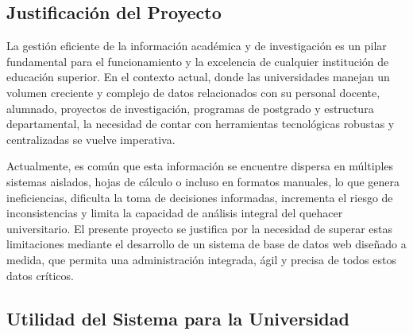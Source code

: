 \subsection{Justificación del Proyecto}
La gestión eficiente de la información académica y de investigación es un pilar fundamental para el funcionamiento y la excelencia de cualquier institución de educación superior. En el contexto actual, donde las universidades manejan un volumen creciente y complejo de datos relacionados con su personal docente, alumnado, proyectos de investigación, programas de postgrado y estructura departamental, la necesidad de contar con herramientas tecnológicas robustas y centralizadas se vuelve imperativa.

Actualmente, es común que esta información se encuentre dispersa en múltiples sistemas aislados, hojas de cálculo o incluso en formatos manuales, lo que genera ineficiencias, dificulta la toma de decisiones informadas, incrementa el riesgo de inconsistencias y limita la capacidad de análisis integral del quehacer universitario. El presente proyecto se justifica por la necesidad de superar estas limitaciones mediante el desarrollo de un sistema de base de datos web diseñado a medida, que permita una administración integrada, ágil y precisa de todos estos datos críticos.

\subsection{Utilidad del Sistema para la Universidad}

